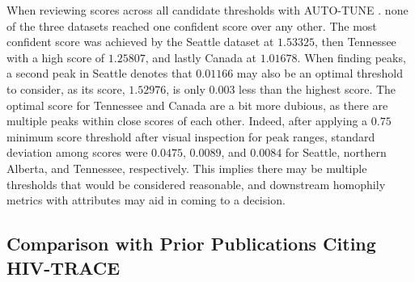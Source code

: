 \documentclass[utf8]{FrontiersinHarvard} %
\begin{document}
When reviewing scores across all candidate thresholds with AUTO-TUNE
\label{fig:clustuner}. none of the three datasets reached one confident score
over any other. The most confident score was achieved by the Seattle dataset at
$1.53325$, then Tennessee with a high score of $1.25807$, and lastly Canada at
$1.01678$. When finding peaks, a second peak in Seattle denotes that $0.01166$
may also be an optimal threshold to consider, as its score, $1.52976$, is only
$0.003$ less than the highest score. The optimal score for Tennessee and Canada
are a bit more dubious, as there are multiple peaks within close scores of each
other. Indeed, after applying a $0.75$ minimum score threshold after visual
inspection for peak ranges, standard deviation among scores were $0.0475$,
$0.0089$, and $0.0084$ for Seattle, northern Alberta, and Tennessee,
respectively. This implies there may be multiple thresholds that would be
considered reasonable, and downstream homophily metrics with attributes may aid
in coming to a decision.

\subsection{Comparison with Prior Publications Citing HIV-TRACE}

\end{document}
